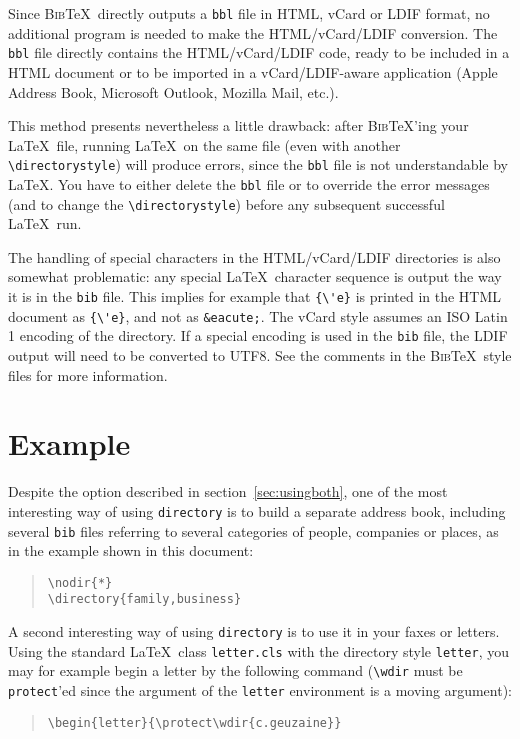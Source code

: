 \documentclass[10pt]{article}
\newcommand{\BibTeX}{\textsc{Bib}\TeX}
\begin{document}
Since \BibTeX\ directly outputs a \texttt{bbl} file in HTML, vCard or LDIF
format, no additional program is needed to make the HTML/vCard/LDIF
conversion. The \texttt{bbl} file directly contains the HTML/vCard/LDIF
code, ready to be included in a HTML document or to be imported in a
vCard/LDIF-aware application (Apple Address Book, Microsoft Outlook, Mozilla
Mail, etc.).

This method presents nevertheless a little drawback: after \BibTeX'ing your
\LaTeX\ file, running \LaTeX\ on the same file (even with another
\verb|\directorystyle|) will produce errors, since the \texttt{bbl} file is
not understandable by \LaTeX. You have to either delete the \texttt{bbl}
file or to override the error messages (and to change the
\verb|\directorystyle|) before any subsequent successful \LaTeX\ run.

The handling of special characters in the HTML/vCard/LDIF directories is
also somewhat problematic: any special \LaTeX\ character sequence is output
the way it is in the \texttt{bib} file. This implies for example that
\verb|{\'e}| is printed in the HTML document as \verb|{\'e}|, and not as
\verb|&eacute;|. The vCard style assumes an ISO Latin 1 encoding of the
directory. If a special encoding is used in the \texttt{bib} file, the LDIF
output will need to be converted to UTF8. See the comments in the \BibTeX\
style files for more information.

\section{Example}
\label{sec:example}

Despite the option described in section~\ref{sec:usingboth}, one of the most
interesting way of using \texttt{directory} is to build a separate address
book, including several \texttt{bib} files referring to several categories of
people, companies or places, as in the example shown in this document:  
\begin{quote}  
\verb|\nodir{*}| \\
\verb|\directory{family,business}|
\end{quote}

A second interesting way of using \texttt{directory} is to use it in your faxes
or letters. Using the standard \LaTeX\ class \texttt{letter.cls} with the
directory style \texttt{letter}, you may for example begin a letter by the
following command (\verb'\wdir' must be \texttt{protect}'ed since the argument
of the \texttt{letter} environment is a moving argument):
\begin{quote}  
\verb'\begin{letter}{\protect\wdir{c.geuzaine}}'
\end{quote}
\end{document}
